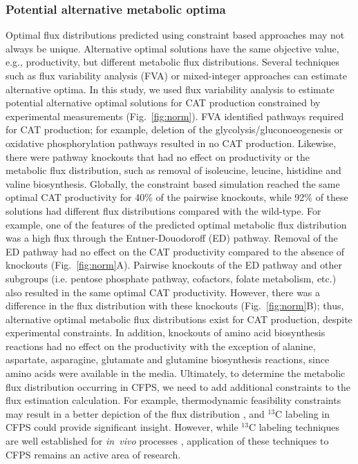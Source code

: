 \documentclass[journal=asbcd6,manuscript=article]{achemso}
\begin{document}
\subsubsection{Potential alternative metabolic optima}
Optimal flux distributions predicted using constraint based approaches may not always be unique.
Alternative optimal solutions have the same objective value, e.g., productivity, but different metabolic flux distributions.
Several techniques such as flux variability analysis (FVA) \cite{Mahadevan2003264,Schuetz119} or mixed-integer approaches \cite{LEE2000711} can estimate alternative optima.
In this study, we used flux variability analysis to estimate potential alternative optimal solutions for CAT production constrained by experimental measurements (Fig.~\ref{fig:norm}).
FVA identified pathways required for CAT production; for example, deletion of the glycolysis/gluconoeogenesis or oxidative phosphorylation pathways resulted in no CAT production.
Likewise, there were pathway knockouts that had no effect on productivity or the metabolic flux distribution, such as removal of isoleucine, leucine, histidine and valine biosynthesis.
Globally, the constraint based simulation reached the same optimal CAT productivity for 40\% of the pairwise knockouts, while 92\% of these solutions had different flux distributions compared with the wild-type.
For example, one of the features of the predicted optimal metabolic flux distribution was a high flux through the Entner-Douodoroff (ED) pathway.
Removal of the ED pathway had no effect on the CAT productivity compared to the absence of knockouts (Fig.~\ref{fig:norm}A).
Pairwise knockouts of the ED pathway and other subgroups (i.e. pentose phosphate pathway, cofactors, folate metabolism, etc.) also resulted in the same optimal CAT productivity.
However, there was a difference in the flux distribution with these knockouts (Fig.~\ref{fig:norm}B); thus, alternative optimal metabolic flux distributions exist for CAT production, despite experimental constraints.
In addition, knockouts of amino acid biosynthesis reactions had no effect on the productivity with the exception of alanine, aspartate, asparagine, glutamate and glutamine biosynthesis reactions, since amino acids were available in the media.
Ultimately, to determine the metabolic flux distribution occurring in CFPS, we need to add additional constraints to the flux estimation calculation.
For example, thermodynamic feasibility constraints may result in a better depiction of the flux distribution \cite{Henry:2007,Hamilton:2013}, and $^{13}$C labeling in CFPS could provide significant insight.
However, while $^{13}$C labeling techniques are well established for \emph{in~vivo} processes \cite{Zamboni:2009}, application of these techniques to CFPS remains an active area of research.
\end{document}
